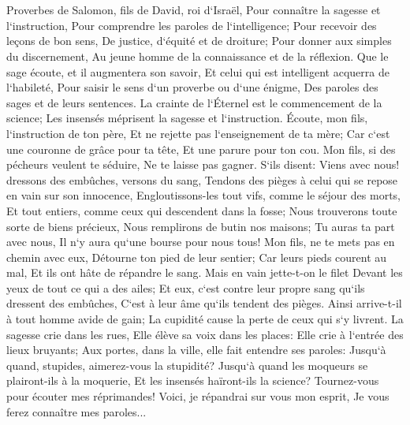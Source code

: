 

\chapter{}

\verse Proverbes de Salomon, fils de David, roi d`Israël, 
\verse Pour connaître la sagesse et l`instruction, Pour comprendre les paroles de l`intelligence; 
\verse Pour recevoir des leçons de bon sens, De justice, d`équité et de droiture; 
\verse Pour donner aux simples du discernement, Au jeune homme de la connaissance et de la réflexion. 
\verse Que le sage écoute, et il augmentera son savoir, Et celui qui est intelligent acquerra de l`habileté, 
\verse Pour saisir le sens d`un proverbe ou d`une énigme, Des paroles des sages et de leurs sentences. 
\verse La crainte de l`Éternel est le commencement de la science; Les insensés méprisent la sagesse et l`instruction. 
\verse Écoute, mon fils, l`instruction de ton père, Et ne rejette pas l`enseignement de ta mère; 
\verse Car c`est une couronne de grâce pour ta tête, Et une parure pour ton cou. 
\verse Mon fils, si des pécheurs veulent te séduire, Ne te laisse pas gagner. 
\verse S`ils disent: Viens avec nous! dressons des embûches, versons du sang, Tendons des pièges à celui qui se repose en vain sur son innocence, 
\verse Engloutissons-les tout vifs, comme le séjour des morts, Et tout entiers, comme ceux qui descendent dans la fosse; 
\verse Nous trouverons toute sorte de biens précieux, Nous remplirons de butin nos maisons; 
\verse Tu auras ta part avec nous, Il n`y aura qu`une bourse pour nous tous! 
\verse Mon fils, ne te mets pas en chemin avec eux, Détourne ton pied de leur sentier; 
\verse Car leurs pieds courent au mal, Et ils ont hâte de répandre le sang. 
\verse Mais en vain jette-t-on le filet Devant les yeux de tout ce qui a des ailes; 
\verse Et eux, c`est contre leur propre sang qu`ils dressent des embûches, C`est à leur âme qu`ils tendent des pièges. 
\verse Ainsi arrive-t-il à tout homme avide de gain; La cupidité cause la perte de ceux qui s`y livrent. 
\verse La sagesse crie dans les rues, Elle élève sa voix dans les places: 
\verse Elle crie à l`entrée des lieux bruyants; Aux portes, dans la ville, elle fait entendre ses paroles: 
\verse Jusqu`à quand, stupides, aimerez-vous la stupidité? Jusqu`à quand les moqueurs se plairont-ils à la moquerie, Et les insensés haïront-ils la science? 
\verse Tournez-vous pour écouter mes réprimandes! Voici, je répandrai sur vous mon esprit, Je vous ferez connaître mes paroles... 
